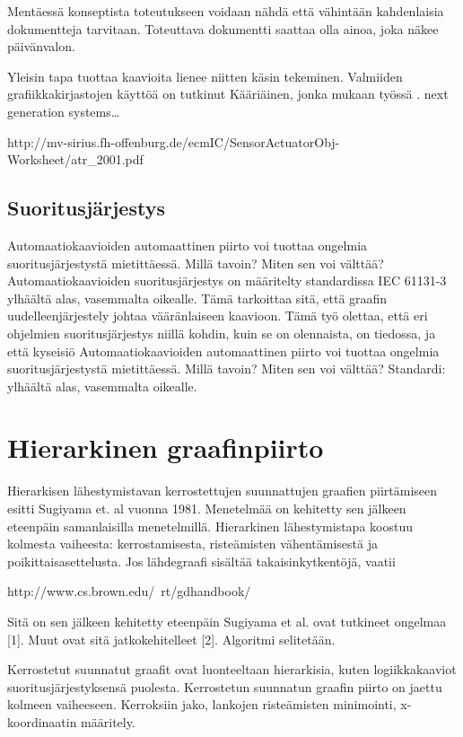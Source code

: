 \documentclass[finnish,12pt]{article}
\begin{document}
Mentäessä konseptista toteutukseen voidaan nähdä että vähintään kahdenlaisia dokumentteja tarvitaan.
Toteuttava dokumentti saattaa olla ainoa, joka näkee päivänvalon. 

Yleisin tapa tuottaa kaavioita lienee niitten käsin tekeminen.
Valmiiden grafiikkakirjastojen käyttöä on tutkinut Kääriäinen, jonka mukaan työssä .
next generation systems…

http://mv-sirius.fh-offenburg.de/ecmIC/SensorActuatorObj-Worksheet/atr_2001.pdf

		\subsection{Suoritusjärjestys}
	
Automaatiokaavioiden automaattinen piirto voi tuottaa ongelmia suoritusjärjestystä mietittäessä. 
Millä tavoin?
Miten sen voi välttää?
Automaatiokaavioiden suoritusjärjestys on määritelty standardissa IEC 61131-3 ylhäältä alas, vasemmalta oikealle.
Tämä tarkoittaa sitä, että graafin uudelleenjärjestely johtaa vääränlaiseen kaavioon.
Tämä työ olettaa, että eri ohjelmien suoritusjärjestys niillä kohdin, kuin se on olennaista, on tiedossa, ja että kyseisiö
Automaatiokaavioiden automaattinen piirto voi tuottaa ongelmia suoritusjärjestystä mietittäessä. 
Millä tavoin?
Miten sen voi välttää?
Standardi: ylhäältä alas, vasemmalta oikealle.



	\clearpage
	\section{Hierarkinen graafinpiirto}

Hierarkisen lähestymistavan kerrostettujen suunnattujen graafien piirtämiseen esitti Sugiyama et. al vuonna 1981.
Menetelmää on kehitetty sen jälkeen eteenpäin samanlaisilla menetelmillä.
Hierarkinen lähestymistapa koostuu kolmesta vaiheesta: kerrostamisesta, risteämisten vähentämisestä ja poikittaisasettelusta.
Jos lähdegraafi sisältää takaisinkytkentöjä, vaatii

http://www.cs.brown.edu/~rt/gdhandbook/

Sitä on sen jälkeen kehitetty eteenpäin 
Sugiyama et al. ovat tutkineet ongelmaa [1]. Muut ovat sitä jatkokehitelleet [2]. Algoritmi selitetään.

Kerrostetut suunnatut graafit ovat luonteeltaan hierarkisia, kuten logiikkakaaviot suoritusjärjestyksensä puolesta.
Kerrostetun suunnatun graafin piirto on jaettu kolmeen vaiheeseen. Kerroksiin jako, lankojen risteämisten minimointi, x-koordinaatin määritely.
\end{document}
